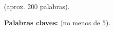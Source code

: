 \chapter*{\runtitulo}

\noindent (aprox. 200 palabras).

\bigskip

\noindent\textbf{Palabras claves:} (no menos de 5).